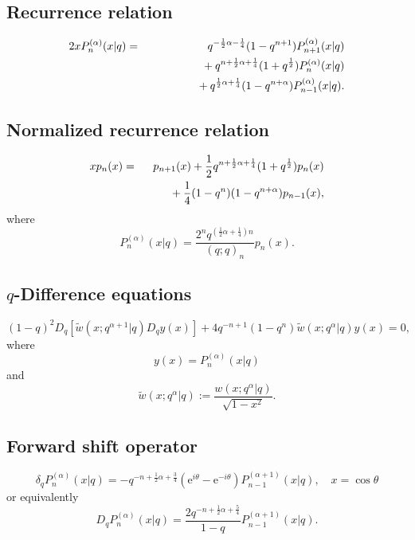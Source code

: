 \documentclass[envcountchap,graybox]{svmono}
\newcommand{\mathindent}{\hspace{7.5mm}}
\newcommand{\e}{\textrm{e}}
\begin{document}
\newpage

\subsection*{Recurrence relation}
\begin{eqnarray}
\label{RecContqLaguerre}
2xP_n^{(\alpha)}(x|q)&=&q^{-\frac{1}{2}\alpha-\frac{1}{4}}(1-q^{n+1})P_{n+1}^{(\alpha)}(x|q)\nonumber\\
& &{}\mathindent{}+q^{n+\frac{1}{2}\alpha+\frac{1}{4}}(1+q^{\frac{1}{2}})P_n^{(\alpha)}(x|q)\nonumber\\
& &{}\mathindent\mathindent{}+q^{\frac{1}{2}\alpha+\frac{1}{4}}(1-q^{n+\alpha})P_{n-1}^{(\alpha)}(x|q).
\end{eqnarray}

\subsection*{Normalized recurrence relation}
\begin{eqnarray}
\label{NormRecContqLaguerre}
xp_n(x)&=&p_{n+1}(x)+\frac{1}{2}q^{n+\frac{1}{2}\alpha+\frac{1}{4}}(1+q^{\frac{1}{2}})p_n(x)\nonumber\\
& &{}\mathindent{}+\frac{1}{4}(1-q^n)(1-q^{n+\alpha})p_{n-1}(x),
\end{eqnarray}
where
$$P_n^{(\alpha)}(x|q)=\frac{2^nq^{(\frac{1}{2}\alpha+\frac{1}{4})n}}{(q;q)_n}p_n(x).$$

\subsection*{$q$-Difference equations}
\begin{equation}
\label{dvContqLaguerre}
(1-q)^2D_q\left[{\tilde w}(x;q^{\alpha+1}|q)D_qy(x)\right]
+4q^{-n+1}(1-q^n){\tilde w}(x;q^{\alpha}|q)y(x)=0,
\end{equation}
where
$$y(x)=P_n^{(\alpha)}(x|q)$$
and
$${\tilde w}(x;q^{\alpha}|q):=\frac{w(x;q^{\alpha}|q)}{\sqrt{1-x^2}}.$$

\subsection*{Forward shift operator}
\begin{equation}
\label{shift1ContqLaguerreI}
\delta_qP_n^{(\alpha)}(x|q)=-q^{-n+\frac{1}{2}\alpha+\frac{3}{4}}
(\e^{i\theta}-\e^{-i\theta})P_{n-1}^{(\alpha+1)}(x|q),\quad x=\cos\theta
\end{equation}
or equivalently
\begin{equation}
\label{shift1ContqLaguerreII}
D_qP_n^{(\alpha)}(x|q)=\frac{2q^{-n+\frac{1}{2}\alpha+\frac{5}{4}}}{1-q}
P_{n-1}^{(\alpha+1)}(x|q).
\end{equation}
\end{document}
